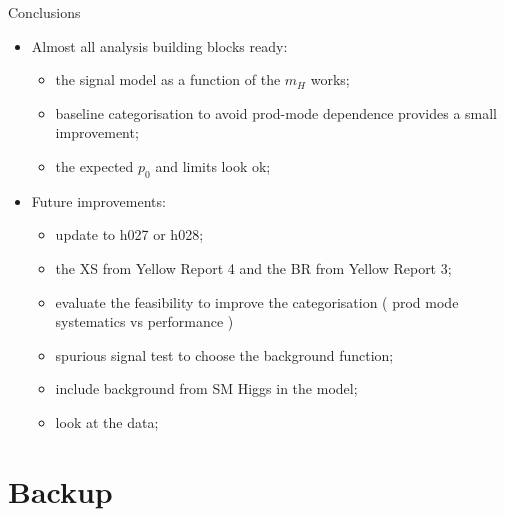 \documentclass[10pt,UKenglish, leqno, xcolor = dvipsnames]{beamer}
\begin{document}
		\begin{frame}{Conclusions}
			\vfill
			\begin{itemize}
				\item Almost all analysis building blocks ready:
				\begin{itemize}
					\item the signal model as a function of the $m_H$ works;
					\item baseline categorisation to avoid prod-mode dependence provides a small improvement;
					\item the expected $p_0$ and limits look ok;
				\end{itemize}
				\item Future improvements:
				\begin{itemize}
					\item update to h027 or h028;
					\item the XS from Yellow Report 4 and the BR from Yellow Report 3;
					\item evaluate the feasibility to improve the categorisation ( prod mode systematics vs performance )
					\item spurious signal test to choose the background function;
					\item include background from SM Higgs in the model;
					\item look at the data;
				\end{itemize}
			\end{itemize}
			\vfill
		\end{frame}
	
	\section{Backup}
	\SectionPage
\end{document}

